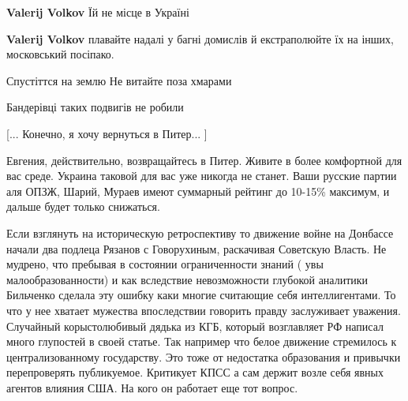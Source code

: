 \begin{itemize}
\begin{itemize}
\textbf{Valerij Volkov} Їй не місце в Україні

 
\textbf{Valerij Volkov} плавайте надалі у багні домислів й екстраполюйте їх на інших, московський посіпако.

 
Спустіттся на землю
Не витайте поза хмарами

\end{itemize}

 
Бандерівці таких подвигів не робили

 

[... Конечно, я хочу вернуться в Питер... ]

Евгения, действительно, возвращайтесь в Питер. Живите в более комфортной для
вас среде. Украина таковой для вас уже никогда не станет. Ваши русские партии
аля ОПЗЖ, Шарий, Мураев имеют суммарный рейтинг до 10-15\% максимум, и дальше
будет только снижаться.


 

Если взглянуть на историческую ретроспективу то движение войне на Донбассе
начали два подлеца Рязанов с Говорухиным, раскачивая Советскую Власть. Не
мудрено, что пребывая в состоянии ограниченности знаний ( увы
малообразованности) и как вследствие невозможности глубокой аналитики Бильченко
сделала эту ошибку каки многие считающие себя интеллигентами. То что у нее
хватает мужества впоследствии говорить правду заслуживает уважения. Случайный
корыстолюбивый дядька из КГБ, который возглавляет РФ написал много глупостей в
своей статье. Так например что белое движение стремилось к централизованному
государству. Это тоже от недостатка образования и привычки перепроверять
публикуемое. Критикует КПСС а сам держит возле себя явных агентов влияния США.
На кого он работает еще тот вопрос.


\end{itemize}
